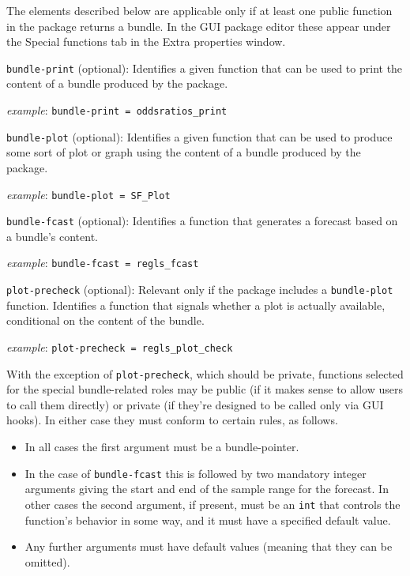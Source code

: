 \documentclass[oneside]{book}
\newcommand{\vbusage}[0]{\textit{example}: \quad}
\begin{document}
The elements described below are applicable only if at least one
public function in the package returns a bundle. In the GUI package
editor these appear under the \textsf{Special functions} tab in the
\textsf{Extra properties} window.

\begin{description}

\item \texttt{bundle-print} (optional): Identifies a given function that can
  be used to print the content of a bundle produced by the package.

  \vbusage{} \verb|bundle-print = oddsratios_print|

\item \texttt{bundle-plot} (optional): Identifies a given function that can
  be used to produce some sort of plot or graph using the content of a
  bundle produced by the package.

  \vbusage{} \verb|bundle-plot = SF_Plot|

\item \texttt{bundle-fcast} (optional): Identifies a function that
  generates a forecast based on a bundle's content.

  \vbusage{} \verb|bundle-fcast = regls_fcast|

\item \texttt{plot-precheck} (optional): Relevant only if the package
  includes a \texttt{bundle-plot} function. Identifies a function that
  signals whether a plot is actually available, conditional on the
  content of the bundle.

  \vbusage{} \verb|plot-precheck = regls_plot_check|

\end{description}

With the exception of \texttt{plot-precheck}, which should be private,
functions selected for the special bundle-related roles may be public
(if it makes sense to allow users to call them directly) or private
(if they're designed to be called only via GUI hooks). In either case
they must conform to certain rules, as follows.
\begin{itemize}
\item In all cases the first argument must be a bundle-pointer.
\item In the case of \texttt{bundle-fcast} this is followed by two
  mandatory integer arguments giving the start and end of the sample
  range for the forecast. In other cases the second argument, if
  present, must be an \texttt{int} that controls the function's
  behavior in some way, and it must have a specified default value.
\item Any further arguments must have default values (meaning that
  they can be omitted).
\end{itemize}
\end{document}
